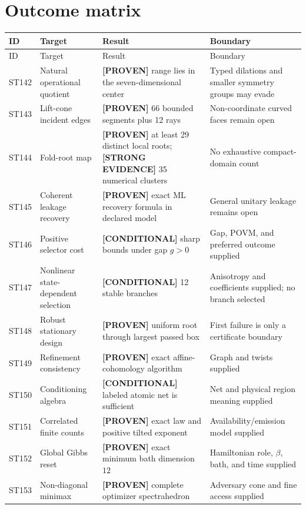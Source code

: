 \documentclass[11pt,a4paper]{article}
\newcommand{\proven}{\textcolor{green!40!black}{\textbf{[PROVEN]}}}
\newcommand{\strong}{\textcolor{blue!70!black}{\textbf{[STRONG EVIDENCE]}}}
\newcommand{\conditional}{\textcolor{violet!65!black}{\textbf{[CONDITIONAL]}}}
\begin{document}
\section{Outcome matrix}
\small
\begin{longtable}{@{}p{}p{}p{}p{}@{}}
\toprule ID & Target & Result & Boundary\\\midrule\endfirsthead
\toprule ID & Target & Result & Boundary\\\midrule\endhead
ST142 & Natural operational quotient & \proven{} range lies in the seven-dimensional center & Typed dilations and smaller symmetry groups may evade\\
ST143 & Lift-cone incident edges & \proven{} 66 bounded segments plus 12 rays & Non-coordinate curved faces remain open\\
ST144 & Fold-root map & \proven{} at least 29 distinct local roots; \strong{} 35 numerical clusters & No exhaustive compact-domain count\\
ST145 & Coherent leakage recovery & \proven{} exact ML recovery formula in declared model & General unitary leakage remains open\\
ST146 & Positive selector cost & \conditional{} sharp bounds under gap $g>0$ & Gap, POVM, and preferred outcome supplied\\
ST147 & Nonlinear state-dependent selection & \conditional{} 12 stable branches & Anisotropy and coefficients supplied; no branch selected\\
ST148 & Robust stationary design & \proven{} uniform root through largest passed box & First failure is only a certificate boundary\\
ST149 & Refinement consistency & \proven{} exact affine-cohomology algorithm & Graph and twists supplied\\
ST150 & Conditioning algebra & \conditional{} labeled atomic net is sufficient & Net and physical region meaning supplied\\
ST151 & Correlated finite counts & \proven{} exact law and positive tilted exponent & Availability/emission model supplied\\
ST152 & Global Gibbs reset & \proven{} exact minimum bath dimension $12$ & Hamiltonian role, $\beta$, bath, and time supplied\\
ST153 & Non-diagonal minimax & \proven{} complete optimizer spectrahedron & Adversary cone and fine access supplied\\
\bottomrule
\end{longtable}
\normalsize
\end{document}
